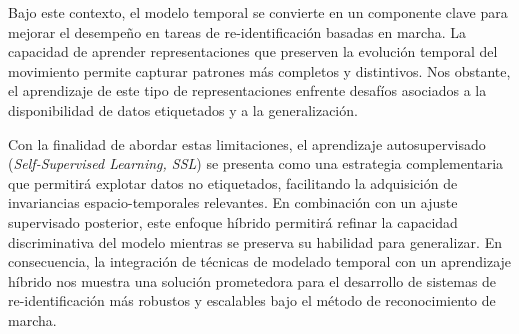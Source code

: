 Bajo este contexto, el modelo temporal se convierte en un componente clave para mejorar el desempeño en tareas de re-identificación basadas en marcha. La capacidad de aprender representaciones que preserven la evolución temporal del movimiento permite capturar patrones más completos y distintivos. Nos obstante, el aprendizaje de este tipo de representaciones enfrente desafíos asociados a la disponibilidad de datos etiquetados y a la generalización.

Con la finalidad de abordar estas limitaciones, el aprendizaje autosupervisado (\textit{Self-Supervised Learning, SSL}) se presenta como una estrategia complementaria que permitirá explotar datos no etiquetados, facilitando la adquisición de invariancias espacio-temporales relevantes. En combinación con un ajuste supervisado posterior, este enfoque híbrido permitirá refinar la capacidad discriminativa del modelo mientras se preserva su habilidad para generalizar. En consecuencia, la integración de técnicas de modelado temporal con un aprendizaje híbrido nos muestra una solución prometedora para el desarrollo de sistemas de re-identificación más robustos y escalables bajo el método de reconocimiento de marcha.

